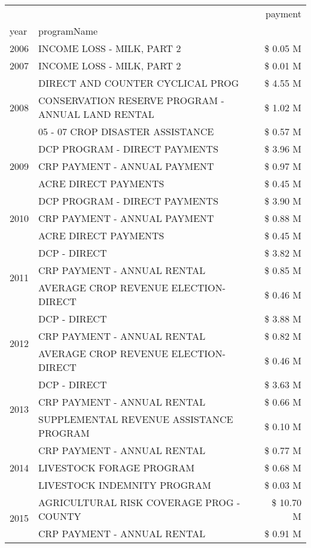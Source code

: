 \begin{tabular}{llr}
\toprule
 &  & payment \\
year & programName &  \\
\midrule
2006 & INCOME LOSS - MILK, PART 2 & \$ 0.05 M \\
\cline{1-3}
2007 & INCOME LOSS - MILK, PART 2 & \$ 0.01 M \\
\cline{1-3}
\multirow[t]{3}{*}{2008} & DIRECT AND COUNTER CYCLICAL PROG & \$ 4.55 M \\
 & CONSERVATION RESERVE PROGRAM - ANNUAL LAND RENTAL & \$ 1.02 M \\
 & 05 - 07 CROP DISASTER ASSISTANCE & \$ 0.57 M \\
\cline{1-3}
\multirow[t]{3}{*}{2009} & DCP PROGRAM - DIRECT PAYMENTS & \$ 3.96 M \\
 & CRP PAYMENT - ANNUAL PAYMENT & \$ 0.97 M \\
 & ACRE DIRECT PAYMENTS & \$ 0.45 M \\
\cline{1-3}
\multirow[t]{3}{*}{2010} & DCP PROGRAM - DIRECT PAYMENTS & \$ 3.90 M \\
 & CRP PAYMENT - ANNUAL PAYMENT & \$ 0.88 M \\
 & ACRE DIRECT PAYMENTS & \$ 0.45 M \\
\cline{1-3}
\multirow[t]{3}{*}{2011} & DCP - DIRECT & \$ 3.82 M \\
 & CRP PAYMENT - ANNUAL RENTAL & \$ 0.85 M \\
 & AVERAGE CROP REVENUE ELECTION-DIRECT & \$ 0.46 M \\
\cline{1-3}
\multirow[t]{3}{*}{2012} & DCP - DIRECT & \$ 3.88 M \\
 & CRP PAYMENT - ANNUAL RENTAL & \$ 0.82 M \\
 & AVERAGE CROP REVENUE ELECTION-DIRECT & \$ 0.46 M \\
\cline{1-3}
\multirow[t]{3}{*}{2013} & DCP - DIRECT & \$ 3.63 M \\
 & CRP PAYMENT - ANNUAL RENTAL & \$ 0.66 M \\
 & SUPPLEMENTAL REVENUE ASSISTANCE PROGRAM & \$ 0.10 M \\
\cline{1-3}
\multirow[t]{3}{*}{2014} & CRP PAYMENT - ANNUAL RENTAL & \$ 0.77 M \\
 & LIVESTOCK FORAGE PROGRAM & \$ 0.68 M \\
 & LIVESTOCK INDEMNITY PROGRAM & \$ 0.03 M \\
\cline{1-3}
\multirow[t]{3}{*}{2015} & AGRICULTURAL RISK COVERAGE PROG - COUNTY & \$ 10.70 M \\
 & CRP PAYMENT - ANNUAL RENTAL & \$ 0.91 M \\

\end{tabular}
